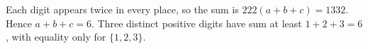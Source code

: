 Each digit appears twice in every place, so the sum is $222(a+b+c)=1332$. Hence $a+b+c=6$. Three distinct positive digits have sum at least $1+2+3=6$, with equality only for $\boxed{\{1,2,3\}}$.
